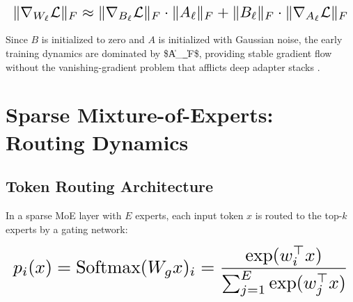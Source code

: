 \documentclass[10pt,twocolumn,letterpaper]{article}
\begin{document}
\begin{equation}
\resizebox{\columnwidth}{!}{$\displaystyle
\begin{aligned}
\|\nabla_{W_\ell}\mathcal{L}\|_F \approx \|\nabla_{B_\ell}\mathcal{L}\|_F \cdot \|A_\ell\|_F + \|B_\ell\|_F \cdot \|\nabla_{A_\ell}\mathcal{L}\|_F
\end{aligned}
$}
\end{equation}























Since $B$ is initialized to zero and $A$ is initialized with Gaussian noise, the early training dynamics are dominated by \$\|A\_\ell\|\_F\$, providing stable gradient flow without the vanishing-gradient problem that afflicts deep adapter stacks \cite{arxiv_2305_18290}.




\section{Sparse Mixture-of-Experts: Routing Dynamics}



\subsection{Token Routing Architecture}


In a sparse MoE layer with $E$ experts, each input token $x$ is routed to the top-$k$ experts by a gating network:























\begin{equation}
\resizebox{\columnwidth}{!}{$\displaystyle
\begin{aligned}
p_i(x) = \text{Softmax}(W_g x)_i = \frac{\exp(w_i^\top x)}{\sum_{j=1}^E \exp(w_j^\top x)}
\end{aligned}
$}
\end{equation}
\end{document}
